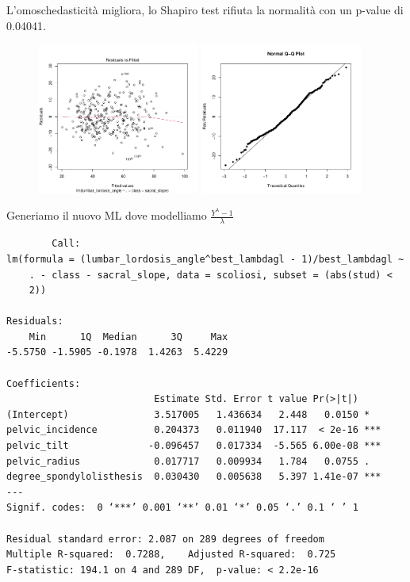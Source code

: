 \documentclass{beamer}
\begin{document}
\begin{frame}
	L'omoschedasticità migliora, lo Shapiro test rifiuta la normalità con un p-value di 0.04041.
	\begin{figure}
	   \includegraphics[width=0.475\textwidth]{07omoschedasticita}
	   \hfill
	   \includegraphics[width=0.475\textwidth]{08qqplot}
	\end{figure}
\end{frame}





\begin{frame}[fragile]
	Generiamo il nuovo ML dove modelliamo $\frac{Y^{\lambda}-1}{\lambda}$

	{\tiny
	\begin{verbatim}
		Call:
lm(formula = (lumbar_lordosis_angle^best_lambdagl - 1)/best_lambdagl ~ 
    . - class - sacral_slope, data = scoliosi, subset = (abs(stud) < 
    2))

Residuals:
    Min      1Q  Median      3Q     Max 
-5.5750 -1.5905 -0.1978  1.4263  5.4229 

Coefficients:
                          Estimate Std. Error t value Pr(>|t|)    
(Intercept)               3.517005   1.436634   2.448   0.0150 *  
pelvic_incidence          0.204373   0.011940  17.117  < 2e-16 ***
pelvic_tilt              -0.096457   0.017334  -5.565 6.00e-08 ***
pelvic_radius             0.017717   0.009934   1.784   0.0755 .  
degree_spondylolisthesis  0.030430   0.005638   5.397 1.41e-07 ***
---
Signif. codes:  0 ‘***’ 0.001 ‘**’ 0.01 ‘*’ 0.05 ‘.’ 0.1 ‘ ’ 1

Residual standard error: 2.087 on 289 degrees of freedom
Multiple R-squared:  0.7288,	Adjusted R-squared:  0.725 
F-statistic: 194.1 on 4 and 289 DF,  p-value: < 2.2e-16
	\end{verbatim}
	}

\end{frame}
\end{document}
